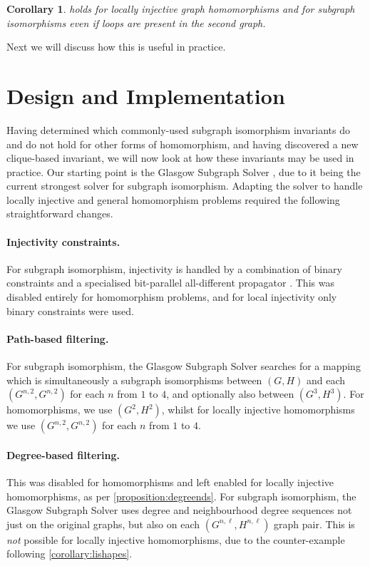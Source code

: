 \documentclass{article}
\newtheorem{corollary}{Corollary}
\begin{document}
\begin{corollary} holds for locally injective graph homomorphisms and for
    subgraph isomorphisms even if loops are present in the second graph.
\end{corollary}

Next we will discuss how this is useful in practice.

\section{Design and Implementation}

Having determined which commonly-used subgraph isomorphism invariants do and do not hold for other
forms of homomorphism, and having discovered a new clique-based invariant, we will now look at how
these invariants may be used in practice. Our starting point is the Glasgow Subgraph Solver
\cite{DBLP:conf/gg/McCreeshP020}, due to it being the current strongest solver for
subgraph isomorphism. Adapting the solver to handle locally injective and general homomorphism
problems required the following straightforward changes.

\paragraph{Injectivity constraints.} For subgraph isomorphism, injectivity is handled by a
combination of binary constraints and a specialised bit-parallel all-different propagator
\cite{DBLP:conf/cp/McCreeshP15}. This was disabled entirely for homomorphism problems, and for local
injectivity only binary constraints were used.

\paragraph{Path-based filtering.} For subgraph isomorphism, the Glasgow Subgraph Solver
searches for a mapping which is simultaneously a subgraph isomorphisms between $(G, H)$ and each
$(G^{n,2}, G^{n,2})$ for each $n$ from $1$ to $4$, and optionally also between $(G^3, H^3)$. For
homomorphisms, we use $(G^2, H^2)$, whilst for locally injective homomorphisms we use $(G^{n,2},
G^{n,2})$ for each $n$ from $1$ to $4$.

\paragraph{Degree-based filtering.} This was disabled for homomorphisms and left enabled for locally
injective homomorphisms, as per \cref{proposition:degreends}. For subgraph isomorphism, the Glasgow
Subgraph Solver uses degree and neighbourhood degree sequences not just on the original graphs, but
also on each $(G^{n,\ell}, H^{n,\ell})$ graph pair. This is \emph{not} possible for locally
injective homomorphisms, due to the counter-example following \cref{corollary:lishapes}.
\end{document}
